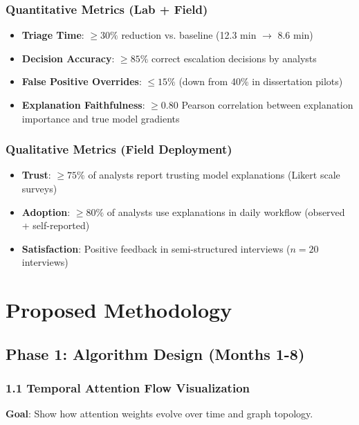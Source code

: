 \documentclass[11pt]{article}
\begin{document}
\subsubsection{Quantitative Metrics (Lab + Field)}

\begin{itemize}
    \item \textbf{Triage Time}: $\geq 30\%$ reduction vs. baseline (12.3 min $\rightarrow$ 8.6 min)
    \item \textbf{Decision Accuracy}: $\geq 85\%$ correct escalation decisions by analysts
    \item \textbf{False Positive Overrides}: $\leq 15\%$ (down from 40\% in dissertation pilots)
    \item \textbf{Explanation Faithfulness}: $\geq 0.80$ Pearson correlation between explanation importance and true model gradients
\end{itemize}

\subsubsection{Qualitative Metrics (Field Deployment)}

\begin{itemize}
    \item \textbf{Trust}: $\geq 75\%$ of analysts report trusting model explanations (Likert scale surveys)
    \item \textbf{Adoption}: $\geq 80\%$ of analysts use explanations in daily workflow (observed + self-reported)
    \item \textbf{Satisfaction}: Positive feedback in semi-structured interviews ($n = 20$ interviews)
\end{itemize}

\section{Proposed Methodology}

\subsection{Phase 1: Algorithm Design (Months 1-8)}

\subsubsection{1.1 Temporal Attention Flow Visualization}

\textbf{Goal}: Show how attention weights evolve over time and graph topology.
\end{document}

